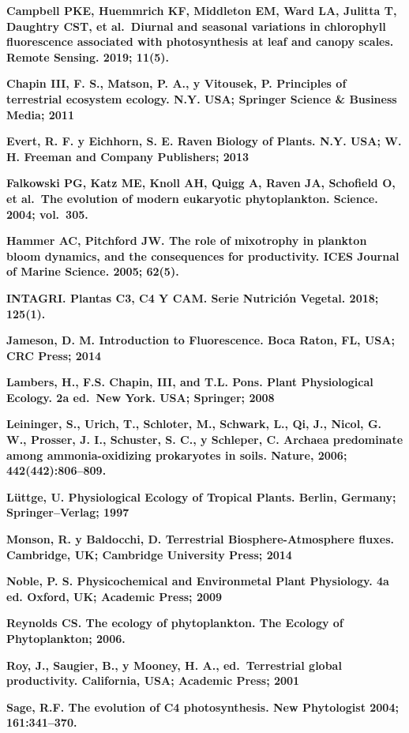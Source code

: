 \documentclass[
]{article}
\begin{document}
\textbf{Campbell PKE, Huemmrich KF, Middleton EM, Ward LA, Julitta T,
Daughtry CST, et al.~Diurnal and seasonal variations in chlorophyll
fluorescence associated with photosynthesis at leaf and canopy scales.
Remote Sensing. 2019; 11(5).}

\textbf{Chapin III, F. S., Matson, P. A., y Vitousek, P. Principles of
terrestrial ecosystem ecology. N.Y. USA; Springer Science \& Business
Media; 2011}

\textbf{Evert, R. F. y Eichhorn, S. E. Raven Biology of Plants. N.Y.
USA; W. H. Freeman and Company Publishers; 2013}

\textbf{Falkowski PG, Katz ME, Knoll AH, Quigg A, Raven JA, Schofield O,
et al.~The evolution of modern eukaryotic phytoplankton. Science. 2004;
vol.~305.}

\textbf{Hammer AC, Pitchford JW. The role of mixotrophy in plankton
bloom dynamics, and the consequences for productivity. ICES Journal of
Marine Science. 2005; 62(5).}

\textbf{INTAGRI. Plantas C3, C4 Y CAM. Serie Nutrición Vegetal. 2018;
125(1).}

\textbf{Jameson, D. M. Introduction to Fluorescence. Boca Raton, FL,
USA; CRC Press; 2014}

\textbf{Lambers, H., F.S. Chapin, III, and T.L. Pons. Plant
Physiological Ecology. 2a ed.~New York. USA; Springer; 2008}

\textbf{Leininger, S., Urich, T., Schloter, M., Schwark, L., Qi, J.,
Nicol, G. W., Prosser, J. I., Schuster, S. C., y Schleper, C. Archaea
predominate among ammonia-oxidizing prokaryotes in soils. Nature, 2006;
442(442):806--809.}

\textbf{Lüttge, U. Physiological Ecology of Tropical Plants. Berlin,
Germany; Springer--Verlag; 1997}

\textbf{Monson, R. y Baldocchi, D. Terrestrial Biosphere-Atmosphere
fluxes. Cambridge, UK; Cambridge University Press; 2014}

\textbf{Noble, P. S. Physicochemical and Environmetal Plant Physiology.
4a ed. Oxford, UK; Academic Press; 2009}

\textbf{Reynolds CS. The ecology of phytoplankton. The Ecology of
Phytoplankton; 2006.}

\textbf{Roy, J., Saugier, B., y Mooney, H. A., ed.~Terrestrial global
productivity. California, USA; Academic Press; 2001}

\textbf{Sage, R.F. The evolution of C4 photosynthesis. New Phytologist
2004; 161:341--370.}
\end{document}
